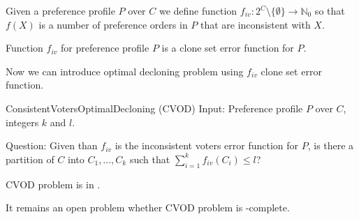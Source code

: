 \begin{defn}
Given a preference profile $P$ over $C$ we define function
$f_{iv}: 2^C \setminus \{\emptyset\} \rightarrow \mathbb{N}_0$ so that
$f(X)$ is a number of preference orders in $P$ that are inconsistent with $X$.
\end{defn}

\begin{rmrk}
Function $f_{iv}$ for preference profile $P$ is a clone set error function for $P$.
\end{rmrk}

Now we can introduce optimal decloning problem using $f_{iv}$ clone set error function.

\begin{problem}{ConsistentVotersOptimalDecloning (CVOD)}
	Input: Preference profile $P$ over $C$, integers $k$ and $l$.

	Question: Given than $f_{iv}$ is the inconsistent voters error function for $P$,
		is there a partition of $C$ into $C_1, ..., C_k$ such that $\sum_{i=1}^k f_{iv}(C_i) \leq l$?
\end{problem}

\begin{rmrk}
\textsc{CVOD} problem is in \np.
\end{rmrk}

It remains an open problem whether \textsc{CVOD} problem is \np-complete.
